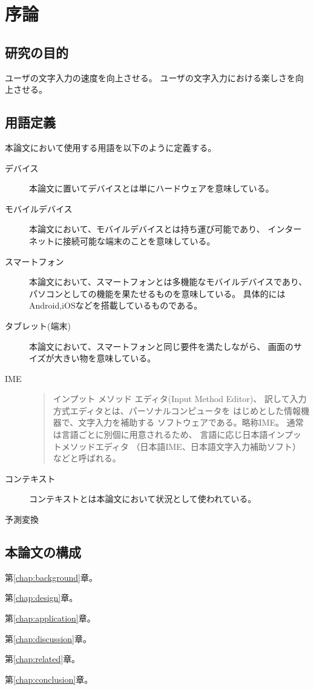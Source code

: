 \chapter{序論}
\label{chap:introduction}

\section{研究の目的}
ユーザの文字入力の速度を向上させる。
ユーザの文字入力における楽しさを向上させる。
\section{用語定義}

本論文において使用する用語を以下のように定義する。

\begin{description}
  \item [デバイス]
    本論文に置いてデバイスとは単にハードウェアを意味している。
  \item [モバイルデバイス]
    本論文において、モバイルデバイスとは持ち運び可能であり、
    インターネットに接続可能な端末のことを意味している。
  \item [スマートフォン]
    本論文において、スマートフォンとは多機能なモバイルデバイスであり、
    パソコンとしての機能を果たせるものを意味している。
    具体的にはAndroid,iOSなどを搭載しているものである。
  \item [タブレット(端末)]
    本論文において、スマートフォンと同じ要件を満たしながら、
    画面のサイズが大きい物を意味している。
  \item [IME]
    \begin{quote}
      インプット メソッド エディタ(Input Method Editor)、
      訳して入力方式エディタとは、パーソナルコンピュータを
      はじめとした情報機器で、文字入力を補助する
      ソフトウェアである。略称IME。
      通常は言語ごとに別個に用意されるため、
      言語に応じ日本語インプットメソッドエディタ
      （日本語IME、日本語文字入力補助ソフト）
      などと呼ばれる。\cite[出典]{ime}
    \end{quote}
  \item [コンテキスト]
    コンテキストとは本論文において状況として使われている。
  \item [予測変換]

\end{description}

\section{本論文の構成}


第\ref{chap:background}章。

第\ref{chap:design}章。

第\ref{chap:application}章。

第\ref{chap:discussion}章。

第\ref{chap:related}章。

第\ref{chap:conclusion}章。

